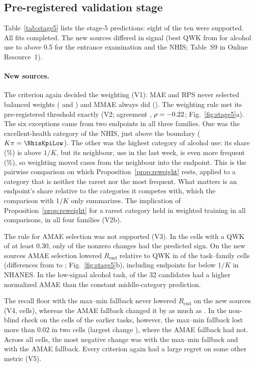 \documentclass[pdflatex,sn-mathphys-ay]{sn-jnl}
\theoremstyle{thmstyleone}
\theoremstyle{thmstylethree}
\begin{document}
\subsection{Pre-registered validation stage}\label{sec:res-stage5}

Table~\ref{tab:stage5} lists the stage-5 predictions: eight of the ten were supported. All \FitsStageFive{} fits completed. The new sources differed in signal (best QWK from \FiveDrugBestQwk{} for alcohol use to above 0.5 for the entrance examination and the NHIS; Table~S9 in Online Resource~1).

\paragraph{New sources.} The criterion again decided the weighting (V1): MAE and RPS never selected balanced weights (\VoneBalMae{} and \VoneBalRps{}) and MMAE always did (\VoneBalMmae{}). The weighting rule met its pre-registered threshold exactly (V2; agreement \VtwoAgr{}, $\rho=-0.22$; Fig.~\ref{fig:stage5}a). The six exceptions came from two endpoints in all three families. One was the excellent-health category of the NHIS, just above the boundary ($K\pi=\NhisKpiLow$). The other was the highest category of alcohol use: its share (\VtwoAlcHighShare\%) is above $1/K$, but its neighbour, use in the last week, is even more frequent (\VtwoAlcNbrShare\%), so weighting moved cases from the neighbour into the endpoint. This is the pairwise comparison on which Proposition~\ref{prop:reweight} rests, applied to a category that is neither the rarest nor the most frequent. What matters is an endpoint's share relative to the categories it competes with, which the comparison with $1/K$ only summarizes. The implication of Proposition~\ref{prop:reweight} for a rarest category held in weighted training in all \VtwobN{} comparisons, in all four families (V2b).

The rule for AMAE selection was not supported (V3). In the cells with a QWK of at least 0.30, only \VthreeOk{} of the \VthreeN{} nonzero changes had the predicted sign. On the new sources AMAE selection lowered $R_{\mathrm{end}}$ relative to QWK in \FiveAmaeNeg{} of the \FiveAmaeCells{} task--family cells (differences from \FiveAmaeMin{} to \FiveAmaeMax{}; Fig.~\ref{fig:stage5}b), including endpoints far below $1/K$ in NHANES. In the low-signal alcohol task, \FiveConstDrug{} of the 32 candidates had a higher normalized AMAE than the constant middle-category prediction.

The recall floor with the max--min fallback never lowered $R_{\mathrm{end}}$ on the new sources (V4, \VfourCells{} cells), whereas the AMAE fallback changed it by as much as \VfourOrigMin{}. In the non-blind check on the \VfourOldCells{} cells of the earlier tasks, however, the max--min fallback lost more than 0.02 in two cells (largest change \VfourOldMin{}), where the AMAE fallback had not. Across all \VfourAllCells{} cells, the most negative change was \VfourAllMinStar{} with the max--min fallback and \VfourAllMinOrig{} with the AMAE fallback. Every criterion again had a large regret on some other metric (V5).
\end{document}
